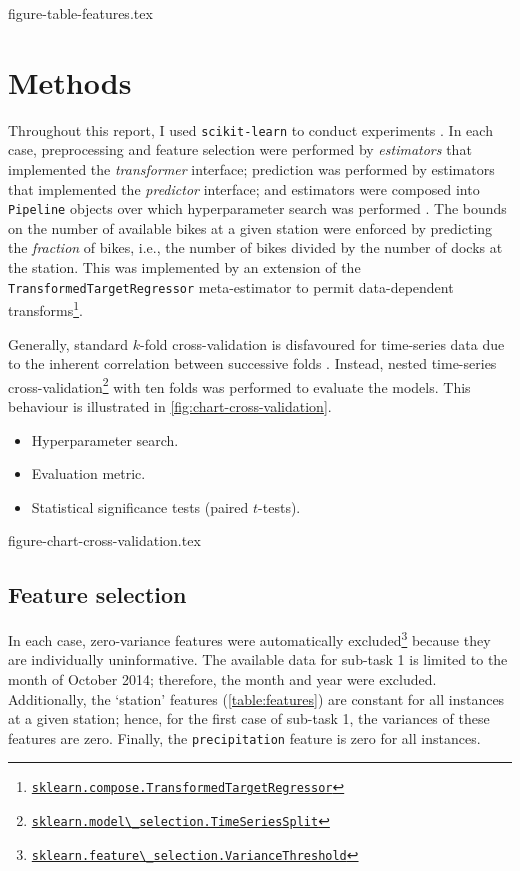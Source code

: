 \documentclass[11pt]{extarticle}
\newcommand{\sklearn}[1]{
  \href{https://scikit-learn.org/stable/modules/generated/sklearn.#1.html}{\lstinline|sklearn.#1|}
}
\begin{document}
{figure-table-features.tex}

\section{Methods}
\label{sec:methods}

Throughout this report, I used \texttt{scikit-learn} to conduct experiments
\parencite{Pedregosa2011}.
In each case, preprocessing and feature selection were performed by \emph{estimators}
that implemented the \emph{transformer} interface; prediction was performed by
estimators that implemented the \emph{predictor} interface; and estimators were
composed into \texttt{Pipeline} objects over which hyperparameter search was performed
\parencite[4-9]{Buitinck2013}.
The bounds on the number of available bikes at a given station were enforced by
predicting the \emph{fraction} of bikes, i.e., the number of bikes divided by the number
of docks at the station.
This was implemented by an extension of the \texttt{TransformedTargetRegressor}
meta-estimator to permit data-dependent
transforms\footnote{\sklearn{compose.TransformedTargetRegressor}}.

Generally, standard $k$-fold cross-validation is disfavoured for time-series data due
to the inherent correlation between successive folds \parencite{Bergmeir2018}.
Instead, nested time-series
cross-validation\footnote{\sklearn{model\_selection.TimeSeriesSplit}} with ten folds
was performed to evaluate the models.
This behaviour is illustrated in \cref{fig:chart-cross-validation}.

\begin{itemize}
  \item Hyperparameter search.
  \item Evaluation metric.
  \item Statistical significance tests (paired $t$-tests).
\end{itemize}

{figure-chart-cross-validation.tex}

\subsection{Feature selection}
\label{sec:feature-selection}

In each case, zero-variance features were automatically
excluded\footnote{\sklearn{feature\_selection.VarianceThreshold}} because they are
individually uninformative.
The available data for sub-task 1 is limited to the month of October 2014; therefore,
the month and year were excluded.
Additionally, the `station' features (\cref{table:features}) are constant for all
instances at a given station; hence, for the first case of sub-task 1, the variances of
these features are zero.
Finally, the \texttt{precipitation} feature is zero for all instances.
\end{document}
